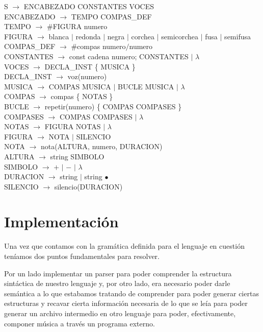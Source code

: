 S $\rightarrow$ ENCABEZADO CONSTANTES VOCES \\
ENCABEZADO $\rightarrow$ TEMPO COMPAS\_DEF \\
TEMPO $\rightarrow$ \#FIGURA numero \\
FIGURA $\rightarrow$ blanca $\mid$ redonda $\mid$ negra $\mid$ corchea $\mid$ semicorchea $\mid$ fusa $\mid$ semifusa \\
COMPAS\_DEF $\rightarrow$ \#compas numero$/$numero  \\
CONSTANTES $\rightarrow$ const cadena numero; CONSTANTES $\mid$ $\lambda$ \\
VOCES $\rightarrow$ DECLA\_INST \{ MUSICA \} \\
DECLA\_INST $\rightarrow$ voz(numero) \\
MUSICA $\rightarrow$ COMPAS MUSICA $\mid$ BUCLE MUSICA $\mid$ $\lambda$ \\
COMPAS $\rightarrow$ compas \{ NOTAS \} \\
BUCLE $\rightarrow$ repetir(numero) \{ COMPAS COMPASES \} \\
COMPASES $\rightarrow$ COMPAS COMPASES $\mid$ $\lambda$ \\
NOTAS $\rightarrow$ FIGURA NOTAS $\mid$ $\lambda$ \\
FIGURA $\rightarrow$ NOTA $\mid$ SILENCIO \\
NOTA $\rightarrow$ nota(ALTURA, numero, DURACION) \\
ALTURA $\rightarrow$ string SIMBOLO \\
SIMBOLO $\rightarrow$ $+$ $\mid$ $-$ $\mid$ $\lambda$ \\
DURACION $\rightarrow$ string $\mid$ string $\bullet$ \\
SILENCIO $\rightarrow$ silencio(DURACION) \\



\section{Implementación}

Una vez que contamos con la gramática definida para el lenguaje en cuestión teníamos dos puntos fundamentales para resolver. 

Por un lado implementar un parser para poder comprender la estructura sintáctica de nuestro lenguaje y, por otro lado, 
era necesario poder darle semántica a lo que estabamos tratando de comprender para poder generar ciertas estructuras y recavar 
cierta información necesaria de lo que se leía para poder generar un archivo intermedio en otro lenguaje para poder, efectivamente,
componer música a través un programa externo.

